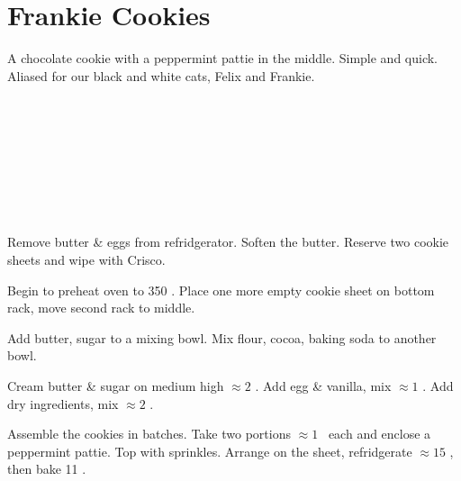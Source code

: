 \section{Frankie Cookies}


\begin{recipestats}[
	servings=12 cookies,
	preptime=30 \minute,
	bakingtime=11 \minute,
	source=\citetitle{entenmanns2011} \cite{entenmanns2011},
]
\end{recipestats}


\begin{recipeabstract}
	A chocolate cookie with a peppermint pattie in the middle.
	Simple and quick.
	Aliased for our black and white cats, Felix and Frankie.
\end{recipeabstract}


\begin{ingredientcolumns}[1]
	\begin{ingredientblock}
		\\
		\\
		\\
		\\
		\\
		\\
		\\
	\end{ingredientblock}
\end{ingredientcolumns}


\begin{preparation}
\item Remove butter \& eggs from refridgerator.
	Soften the butter.
	Reserve two cookie sheets and wipe with Crisco.

\item Begin to preheat oven to 350 \Fahrenheit.
	Place one more empty cookie sheet on bottom rack, move second rack to middle.

\item Add butter, sugar to a mixing bowl.
	Mix flour, cocoa, baking soda to another bowl.

\item Cream butter \& sugar on medium high $\approx 2$ \minute.
	Add egg \& vanilla, mix $\approx 1$ \minute.
	Add dry ingredients, mix $\approx 2$ \minute.

\item Assemble the cookies in batches.
	Take two portions $\approx 1$ \Tablespoon~each and enclose a peppermint pattie.
	Top with sprinkles.
	Arrange on the sheet, refridgerate $\approx 15$ \minute, then bake 11 \minute.
\end{preparation}


